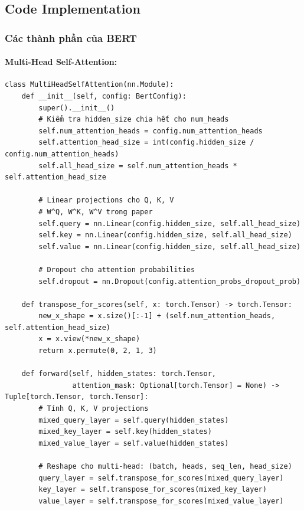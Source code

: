 \subsection{Code Implementation}
\label{subsec:code_implementation}

\subsubsection{Các thành phần của BERT}
\label{subsubsec:bert_architecture}

\paragraph{Multi-Head Self-Attention:}
\begin{verbatim}
class MultiHeadSelfAttention(nn.Module):
    def __init__(self, config: BertConfig):
        super().__init__()
        # Kiểm tra hidden_size chia hết cho num_heads
        self.num_attention_heads = config.num_attention_heads
        self.attention_head_size = int(config.hidden_size / config.num_attention_heads)
        self.all_head_size = self.num_attention_heads * self.attention_head_size

        # Linear projections cho Q, K, V
        # W^Q, W^K, W^V trong paper
        self.query = nn.Linear(config.hidden_size, self.all_head_size)
        self.key = nn.Linear(config.hidden_size, self.all_head_size)
        self.value = nn.Linear(config.hidden_size, self.all_head_size)

        # Dropout cho attention probabilities
        self.dropout = nn.Dropout(config.attention_probs_dropout_prob)

    def transpose_for_scores(self, x: torch.Tensor) -> torch.Tensor:
        new_x_shape = x.size()[:-1] + (self.num_attention_heads, self.attention_head_size)
        x = x.view(*new_x_shape)
        return x.permute(0, 2, 1, 3)

    def forward(self, hidden_states: torch.Tensor, 
                attention_mask: Optional[torch.Tensor] = None) -> Tuple[torch.Tensor, torch.Tensor]:
        # Tính Q, K, V projections
        mixed_query_layer = self.query(hidden_states)
        mixed_key_layer = self.key(hidden_states)
        mixed_value_layer = self.value(hidden_states)

        # Reshape cho multi-head: (batch, heads, seq_len, head_size)
        query_layer = self.transpose_for_scores(mixed_query_layer)
        key_layer = self.transpose_for_scores(mixed_key_layer)
        value_layer = self.transpose_for_scores(mixed_value_layer)


\end{verbatim}
